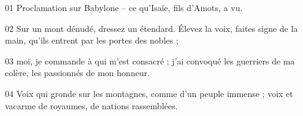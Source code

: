 01 Proclamation sur Babylone – ce qu’Isaïe, fils d’Amots, a vu.

02 Sur un mont dénudé, dressez un étendard. Élevez la voix, faites signe de la main, qu’ils entrent par les portes des nobles ;

03 moi, je commande à qui m’est consacré ; j’ai convoqué les guerriers de ma colère, les passionnés de mon honneur.

04 Voix qui gronde sur les montagnes, comme d’un peuple immense ; voix et vacarme de royaumes, de nations rassemblées.
